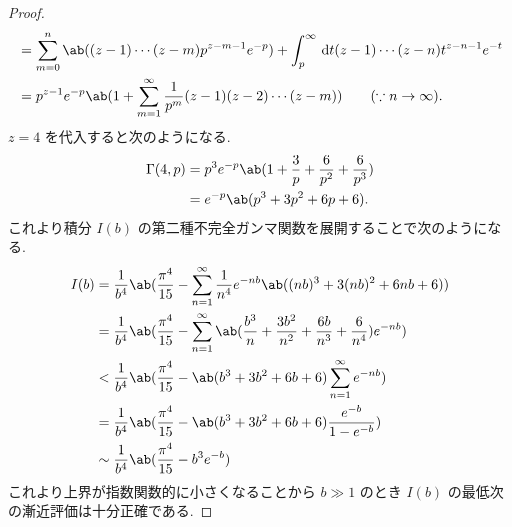\documentclass[a4paper,11pt]{jlreq}
\begin{document}
\begin{proof}
\begin{align}
                 & = \sum_{m=0}^n\ab((z-1)\cdots(z-m)p^{z-m-1}e^{-p}) + \int_p^\infty\dl{t} (z-1)\cdots(z-n)t^{z-n-1}e^{-t}                \\
                 & = p^{z-1}e^{-p}\ab(1 + \sum_{m=1}^{\infty}\frac{1}{p^m}(z-1)(z-2)\cdots(z-m)) \qquad (\because n\to\infty).
  \end{align}
  $z = 4$ を代入すると次のようになる.
  \begin{align}
    \Gamma(4, p) & = p^{3}e^{-p}\ab(1 + \frac{3}{p} + \frac{6}{p^2} + \frac{6}{p^3}) \\
                 & = e^{-p}\ab(p^3 + 3p^2 + 6p + 6).
  \end{align}
  これより積分 $I(b)$ の第二種不完全ガンマ関数を展開することで次のようになる.
  \begin{align}
    I(b) & = \frac{1}{b^4}\ab(\frac{\pi^4}{15} - \sum_{n=1}^{\infty}\frac{1}{n^4}e^{-nb}\ab((nb)^3 + 3(nb)^2 + 6nb + 6))                           \\
         & = \frac{1}{b^4}\ab(\frac{\pi^4}{15} - \sum_{n=1}^{\infty}\ab(\frac{b^3}{n} + \frac{3b^2}{n^2} + \frac{6b}{n^3} + \frac{6}{n^4})e^{-nb}) \\
         & < \frac{1}{b^4}\ab(\frac{\pi^4}{15} - \ab(b^3 + 3b^2 + 6b + 6)\sum_{n=1}^{\infty}e^{-nb})                                               \\
         & = \frac{1}{b^4}\ab(\frac{\pi^4}{15} - \ab(b^3 + 3b^2 + 6b + 6)\frac{e^{-b}}{1 - e^{-b}})                                                \\
         & \sim \frac{1}{b^4}\ab(\frac{\pi^4}{15} - b^3e^{-b})
  \end{align}
  これより上界が指数関数的に小さくなることから $b\gg 1$ のとき $I(b)$ の最低次の漸近評価は十分正確である.
\end{proof}
\end{document}
